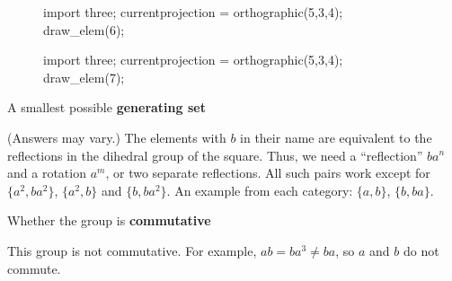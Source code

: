 \documentclass[../key.tex]{subfiles}
\begin{document}
\begin{figure}[h]
	\begin{center}
		\begin{minipage}[b]{0.45\textwidth}
			\centering
			\begin{asy}[width=0.65\textwidth]
				import three;
				currentprojection = orthographic(5,3,4);
				draw_elem(6);
			\end{asy}
		\end{minipage}
		\hfill
		\begin{minipage}[b]{0.45\textwidth}
			\centering
			\begin{asy}[width=0.7\textwidth]
				import three;
				currentprojection = orthographic(5,3,4);
				draw_elem(7);
			\end{asy}
		\end{minipage}
	\end{center}
	\vspace*{-2\baselineskip}
	\begin{center}
		\begin{minipage}[t]{\textwidth}
			\label{fig:this_took_me_so_long}
		\end{minipage}
	\end{center}
	\vspace*{-2\baselineskip}
\end{figure}

\begin{inner_problem}
\item A smallest possible \textbf{generating set}
\end{inner_problem}

\noindent(Answers may vary.)
The elements with $b$ in their name are equivalent to the reflections in the dihedral group of the square. Thus, we need a ``reflection'' $ba^n$ and a rotation $a^m$, or two separate reflections. All such pairs work except for $\{a^2,ba^2\}$, $\{a^2,b\}$ and $\{b,ba^2\}$. An example from each category: $\{a,b\}$, $\{b,ba\}$.

\begin{inner_problem}
\item Whether the group is \textbf{commutative}
\end{inner_problem}

\noindent This group is not commutative. For example, $ab=ba^3\neq ba$, so $a$ and $b$ do not commute.
\end{document}
